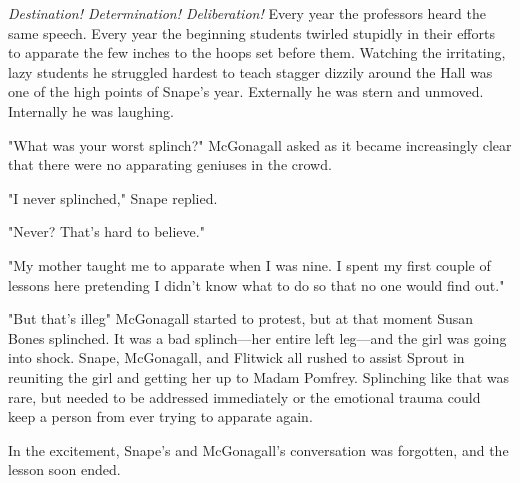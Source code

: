 \emph{Destination! Determination! Deliberation!} Every year the professors heard the same speech. Every year the beginning students twirled stupidly in their efforts to apparate the few inches to the hoops set before them. Watching the irritating, lazy students he struggled hardest to teach stagger dizzily around the Hall was one of the high points of Snape's year. Externally he was stern and unmoved. Internally he was laughing.

"What was your worst splinch?" McGonagall asked as it became increasingly clear that there were no apparating geniuses in the crowd.

"I never splinched," Snape replied.

"Never? That's hard to believe."

"My mother taught me to apparate when I was nine. I spent my first couple of lessons here pretending I didn't know what to do so that no one would find out."

"But that's illeg{\el}" McGonagall started to protest, but at that moment Susan Bones splinched. It was a bad splinch—her entire left leg—and the girl was going into shock. Snape, McGonagall, and Flitwick all rushed to assist Sprout in reuniting the girl and getting her up to Madam Pomfrey. Splinching like that was rare, but needed to be addressed immediately or the emotional trauma could keep a person from ever trying to apparate again.

In the excitement, Snape's and McGonagall's conversation was forgotten, and the lesson soon ended.


